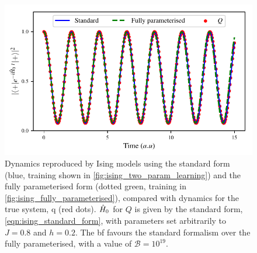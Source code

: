 \begin{figure}[t]
    \begin{center}
        \includegraphics{theoretical_study/figures/dynamics.pdf}
    \end{center}
    \caption[Ising model forms' dynamics]{
        Dynamics reproduced by Ising models using the standard form (blue, training shown in \cref{fig:ising_two_param_learning}) 
        and the fully parameterised form (dotted green, training in \cref{fig:ising_fully_parameterised}), 
        compared with dynamics for the true system, \gls{q} (red dots).
        $\hat{H}_0$ for $Q$ is given by the standard form, \cref{eqn:ising_standard_form}, with parameters set arbitrarily to $J=0.8$ and $h=0.2$.
        The \acrlong{bf} favours the standard formalism over the fully parameterised, with  a value of $\mathcal{B}=10^{19}$.
        \figtableref
    }
    \label{fig:ising_model_types_dynamics}
\end{figure}


